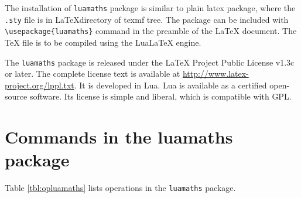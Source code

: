 \documentclass{article}
\begin{document}
The installation of \verb|luamaths| package is similar to plain latex package, where the \texttt{.sty} file is in \LaTeX directory of texmf tree. The package can be included with \verb|\usepackage{luamaths}| command in the preamble of the LaTeX document. The TeX file is to be compiled using the LuaLaTeX engine.


The \verb|luamaths| package is released under the LaTeX Project Public License v1.3c or later. The complete license text is available at \url{http://www.latex-project.org/lppl.txt}. It is developed in Lua.  Lua is available as a certified open-source software. Its license is simple and liberal, which is compatible with GPL.

\section{Commands in the luamaths package}
Table \ref{tbl:opluamaths} lists operations in the \verb|luamaths| package.
\end{document}
